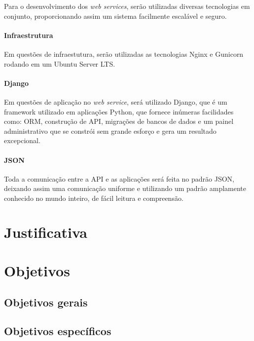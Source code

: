 \documentclass[
	12pt,
	oneside,
	a4paper,
	english,
	brazil,
]{abntex2}
\begin{document}
Para o desenvolvimento dos \emph{web services}, serão utilizadas diversas tecnologias em conjunto, proporcionando assim um sistema facilmente escalável e seguro. 

\subsubsection{Infraestrutura}

Em questões de infraestutura, serão utilizadas as tecnologias Nginx e Gunicorn rodando em um Ubuntu Server LTS.

\subsubsection{Django}

Em questões de aplicação no \emph{web service}, será utilizado Django, que é um framework utilizado em aplicações Python, que fornece inúmeras facilidades como: ORM, construção de API, migrações de bancos de dados e um painel administrativo que se constrói sem grande esforço e gera um resultado excepcional.

\subsubsection{JSON}

Toda a comunicação entre a API e as aplicações será feita no padrão JSON, deixando assim uma comunicação uniforme e utilizando um padrão amplamente conhecido no mundo inteiro, de fácil leitura e compreensão.



\chapter{Justificativa}


\chapter{Objetivos}
\section{Objetivos gerais}
\section{Objetivos específicos}
\end{document}
